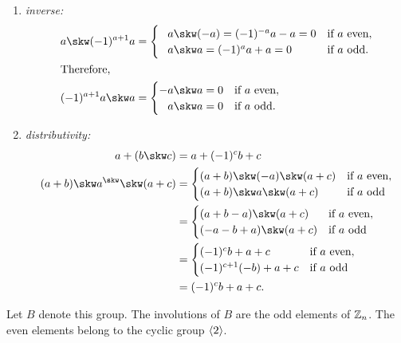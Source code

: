 \begin{xmpls}
\begin{enumerate}[a),font=\upshape]
\begin{enumerate}[-]
        \item \textit{inverse:}
            \begin{align*}
                a\skw(-1)^{a+1}a &= 
                    \begin{cases}
                        \hphantom-a\skw(-a)=(-1)^{-a}a-a=0
                            &\text{if }a\text{ even},\\
                        \hphantom-a\skw a= (-1)^aa+a =0
                            &\text{if }a \text{ odd}.
                    \end{cases}\\
            \intertext{Therefore,}
                (-1)^{a+1}a\skw a &=
                    \begin{cases}
                        -a\skw a = 0    &\text{if $a$ even},\\
                        \hphantom-a\skw a = 0    &\text{if $a$ odd.}
                    \end{cases}
            \end{align*}
        \item \textit{distributivity:}
            \begin{align*}
                a+(b\skw c) &= a+(-1)^cb + c\\
                (a+b)\skw a^\skw\skw(a+c)
                    &= \begin{cases}
                        (a+b)\skw(-a)\skw(a+c)  &\text{if $a$ even},\\
                        (a+b)\skw a\skw(a+c)    &\text{if $a$ odd}
                    \end{cases}\\
                    &= \begin{cases}
                        (a+b-a)\skw(a+c)    &\text{if $a$ even},\\
                        (-a-b+a)\skw(a+c)   &\text{if $a$ odd}
                    \end{cases}\\
                    &= \begin{cases}
                        (-1)^cb+a+c     &\text{if $a$ even},\\
                        (-1)^{c+1}(-b)+a+c  &\text{if $a$ odd}
                    \end{cases}\\
                    &= (-1)^cb + a + c.
            \end{align*}
    \end{enumerate}
    Let $B$ denote this group. The involutions of $B$ are the odd elements of $\mathbb{Z}_n$. The even elements belong to the cyclic group $\langle2\rangle$.


\end{enumerate}
\end{xmpls}
